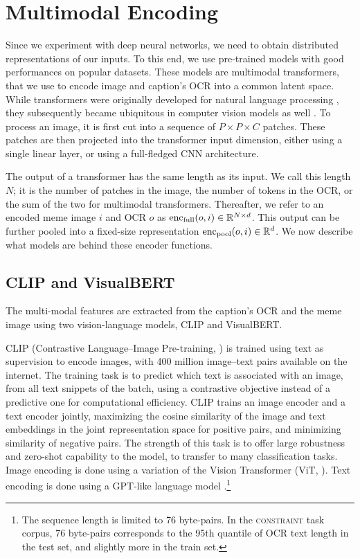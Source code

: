 \section{Multimodal Encoding}
\label{sec:encoding}
Since we experiment with deep neural networks, we need to obtain distributed representations of our inputs.
To this end, we use pre-trained models with good performances on popular datasets.
These models are multimodal transformers, that we use to encode image and caption's OCR into a common latent space.
While transformers were originally developed for natural language processing \citep{transformers, bert}, they subsequently became ubiquitous in computer vision models as well \citep{dosovitskiy2020image}.
To process an image, it is first cut into a sequence of \(P\times P\times C\) patches.
These patches are then projected into the transformer input dimension, either using a single linear layer, or using a full-fledged CNN architecture.

The output of a transformer has the same length as its input.
We call this length \(N\); it is the number of patches in the image, the number of tokens in the OCR, or the sum of the two for multimodal transformers.
Thereafter, we refer to an encoded meme image \(i\) and OCR \(o\) as \(\encoder[full](o, i)\in\mathbb{R}^{N\times d}\).
This output can be further pooled into a fixed-size representation \(\encoder[pool](o, i)\in\mathbb{R}^d\).
We now describe what models are behind these encoder functions.

\subsection{CLIP and VisualBERT}
The multi-modal features are extracted from the caption's OCR and the meme image using two vision-language models, CLIP and VisualBERT. 

CLIP (Contrastive Language–Image Pre-training, \citealp{radford2021learning}) is trained using text as supervision to encode images, with 400 million image–text pairs available on the internet. The training task is to predict which text is associated with an image, from all text snippets of the batch, using a contrastive objective instead of a predictive one for computational efficiency.
CLIP trains an image encoder and a text encoder jointly,  maximizing the cosine similarity of the image and text embeddings in the joint representation space for positive pairs, and minimizing similarity of negative pairs. The strength of this task is to offer large robustness and zero-shot capability to the model, to transfer to many classification tasks. Image encoding is done using a variation of the Vision Transformer (ViT, \citealp{dosovitskiy2020image}). Text encoding is done using a GPT-like language model \cite{radford2019language}.\footnote{The sequence length is limited to 76 byte-pairs. In the \textsc{constraint} task corpus, 76 byte-pairs corresponds to the 95th quantile of OCR text length in the test set, and slightly more in the train set.}


